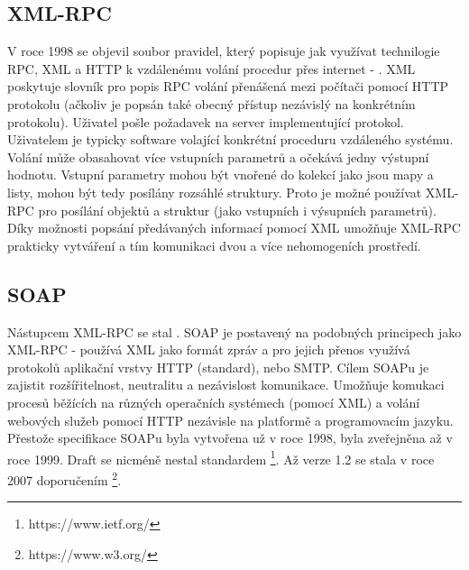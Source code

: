 {%



\subsection{XML-RPC}
V roce 1998 se objevil soubor pravidel, který popisuje jak využívat technilogie RPC, XML a HTTP k vzdálenému volání procedur přes internet - .\cite{Winner99} XML poskytuje slovník pro popis RPC volání přenášená mezi počítači pomocí HTTP protokolu (ačkoliv je popsán také obecný přístup nezávislý na konkrétním protokolu). Uživatel pošle požadavek na server implementující protokol. Uživatelem je typicky software volající konkrétní proceduru vzdáleného systému. Volání může obasahovat více vstupních parametrů a očekává jedny výstupní hodnotu. Vstupní parametry mohou být vnořené do kolekcí jako jsou mapy a listy, mohou být tedy posílány rozsáhlé struktury. Proto je možné používat XML-RPC pro posílání objektů a struktur (jako vstupních i výsupních parametrů). Díky možnosti popsání předávaných informací pomocí XML umožňuje XML-RPC prakticky vytváření  a tím komunikaci dvou a více nehomogeních prostředí.\cite{Laurent01}  

\subsection{SOAP}
Nástupcem XML-RPC se stal . SOAP je postavený na podobných principech jako XML-RPC - používá XML jako formát zpráv a pro jejich přenos využívá protokolů aplikační vrstvy HTTP (standard), nebo SMTP. Cílem SOAPu je zajistit rozšířitelnost, neutralitu a nezávislost komunikace. Umožňuje komukaci procesů běžících na různých operačních systémech (pomocí XML) a volání webových služeb pomocí HTTP nezávisle na platformě a programovacím jazyku. 
Přestože specifikace SOAPu byla vytvořena už v roce 1998, byla zveřejněna až v roce 1999. Draft se nicméně nestal standardem \footnote{https://www.ietf.org/}.\cite{Box01} Až verze 1.2 se stala v roce 2007 doporučením \footnote{https://www.w3.org/}.\cite{W3C07}

}
